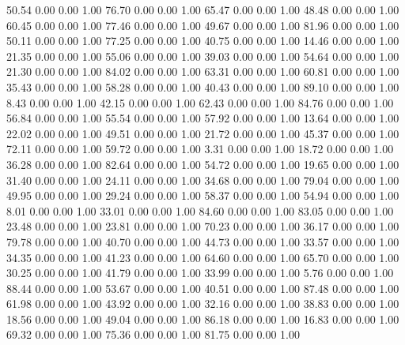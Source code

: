    50.54   0.00   0.00   1.00
   76.70   0.00   0.00   1.00
   65.47   0.00   0.00   1.00
   48.48   0.00   0.00   1.00
   60.45   0.00   0.00   1.00
   77.46   0.00   0.00   1.00
   49.67   0.00   0.00   1.00
   81.96   0.00   0.00   1.00
   50.11   0.00   0.00   1.00
   77.25   0.00   0.00   1.00
   40.75   0.00   0.00   1.00
   14.46   0.00   0.00   1.00
   21.35   0.00   0.00   1.00
   55.06   0.00   0.00   1.00
   39.03   0.00   0.00   1.00
   54.64   0.00   0.00   1.00
   21.30   0.00   0.00   1.00
   84.02   0.00   0.00   1.00
   63.31   0.00   0.00   1.00
   60.81   0.00   0.00   1.00
   35.43   0.00   0.00   1.00
   58.28   0.00   0.00   1.00
   40.43   0.00   0.00   1.00
   89.10   0.00   0.00   1.00
    8.43   0.00   0.00   1.00
   42.15   0.00   0.00   1.00
   62.43   0.00   0.00   1.00
   84.76   0.00   0.00   1.00
   56.84   0.00   0.00   1.00
   55.54   0.00   0.00   1.00
   57.92   0.00   0.00   1.00
   13.64   0.00   0.00   1.00
   22.02   0.00   0.00   1.00
   49.51   0.00   0.00   1.00
   21.72   0.00   0.00   1.00
   45.37   0.00   0.00   1.00
   72.11   0.00   0.00   1.00
   59.72   0.00   0.00   1.00
    3.31   0.00   0.00   1.00
   18.72   0.00   0.00   1.00
   36.28   0.00   0.00   1.00
   82.64   0.00   0.00   1.00
   54.72   0.00   0.00   1.00
   19.65   0.00   0.00   1.00
   31.40   0.00   0.00   1.00
   24.11   0.00   0.00   1.00
   34.68   0.00   0.00   1.00
   79.04   0.00   0.00   1.00
   49.95   0.00   0.00   1.00
   29.24   0.00   0.00   1.00
   58.37   0.00   0.00   1.00
   54.94   0.00   0.00   1.00
    8.01   0.00   0.00   1.00
   33.01   0.00   0.00   1.00
   84.60   0.00   0.00   1.00
   83.05   0.00   0.00   1.00
   23.48   0.00   0.00   1.00
   23.81   0.00   0.00   1.00
   70.23   0.00   0.00   1.00
   36.17   0.00   0.00   1.00
   79.78   0.00   0.00   1.00
   40.70   0.00   0.00   1.00
   44.73   0.00   0.00   1.00
   33.57   0.00   0.00   1.00
   34.35   0.00   0.00   1.00
   41.23   0.00   0.00   1.00
   64.60   0.00   0.00   1.00
   65.70   0.00   0.00   1.00
   30.25   0.00   0.00   1.00
   41.79   0.00   0.00   1.00
   33.99   0.00   0.00   1.00
    5.76   0.00   0.00   1.00
   88.44   0.00   0.00   1.00
   53.67   0.00   0.00   1.00
   40.51   0.00   0.00   1.00
   87.48   0.00   0.00   1.00
   61.98   0.00   0.00   1.00
   43.92   0.00   0.00   1.00
   32.16   0.00   0.00   1.00
   38.83   0.00   0.00   1.00
   18.56   0.00   0.00   1.00
   49.04   0.00   0.00   1.00
   86.18   0.00   0.00   1.00
   16.83   0.00   0.00   1.00
   69.32   0.00   0.00   1.00
   75.36   0.00   0.00   1.00
   81.75   0.00   0.00   1.00
